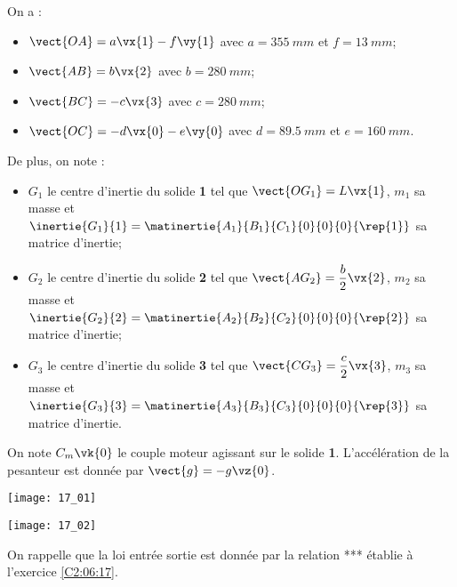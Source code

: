 \normalfalse \difficilefalse \tdifficiletrue
\correctionfalse


\setcounter{question}{0}
\ifcorrection
\else
{}
\fi

\ifprof
\else
On a : 
\begin{itemize}
\item $\vect{OA} = a \vx{1}-f \vy{1}$ avec $a=\SI{355}{mm}$ et $f=\SI{13}{mm}$;
\item $\vect{AB} = b \vx{2}$ avec $b=\SI{280}{mm}$;
\item $\vect{BC} = -c \vx{3}$ avec $c=\SI{280}{mm}$;
\item $\vect{OC} = -d \vx{0}-e\vy{0}$ avec $d=\SI{89,5}{mm}$ et $e=\SI{160}{mm}$.
\end{itemize}
De plus, on note :
\begin{itemize}
\item $G_1$ le centre d'inertie du solide \textbf{1} tel que $\vect{OG_1}=L \vx{1}$, $m_1$ sa masse et $\inertie{G_1}{1}=\matinertie{A_1}{B_1}{C_1}{0}{0}{0}{\rep{1}}$ sa matrice d'inertie;
\item $G_2$ le centre d'inertie du solide \textbf{2} tel que $\vect{AG_2}=\dfrac{b}{2}\vx{2}$, $m_2$ sa masse et $\inertie{G_2}{2}=\matinertie{A_2}{B_2}{C_2}{0}{0}{0}{\rep{2}}$ sa matrice d'inertie;
\item $G_3$ le centre d'inertie du solide \textbf{3} tel que $\vect{CG_3}=\dfrac{c}{2}\vx{3}$, $m_3$ sa masse et $\inertie{G_3}{3}=\matinertie{A_3}{B_3}{C_3}{0}{0}{0}{\rep{3}}$ sa matrice d'inertie.
\end{itemize}
On note $C_m\vk{0}$ le couple moteur agissant sur le solide \textbf{1}. L'accélération de la pesanteur est donnée par $\vect{g}=-g\vz{0}$.

\begin{center}
\texttt{[image: 17\_01]}

\texttt{[image: 17\_02]}
\end{center}
\fi
On rappelle que la loi entrée sortie est donnée par la relation *** établie à l'exercice \ref{C2:06:17}.

